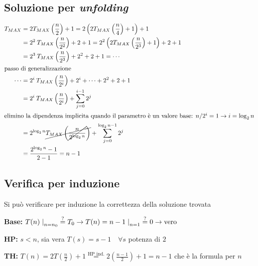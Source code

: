 \subsection{Soluzione per \textit{unfolding}}
\begin{equation*}
    \begin{split}
        T_{MAX} &=
        2 T_{MAX} \left( \frac{n}{2} \right) + 1
        = 2 \left( 2 T_{MAX} \left( \frac{n}{4} \right) + 1 \right) + 1 \\
        &= 2^2 \:T_{MAX} \left( \frac{n}{2^2} \right) +2 +1
        = 2^2 \left( 2 T_{MAX} \left( \frac{n}{2^3} \right) + 1 \right) +2+1 \\
        &= 2^3 \:T_{MAX} \left( \frac{n}{2^3} \right) +2^2 +2 +1 = \cdots \\ 
        \intertext{passo di generalizzazione}
        \cdots &=2^i \:T_{MAX} \left( \frac{n}{2^i} \right) +2^i + \cdots +2^2 +2 +1 \\
        &= 2^i \:T_{MAX} \left( \frac{n}{2^i} \right) + \sum_{j=0}^{i-1} 2^j \\
        \intertext{elimino la dipendenza implicita quando il parametro è un valore base: $n / 2^i=1 \rightarrow i=\log_2 n$}
        &= 2^{\log_2 n} \cancel{ T_{MAX} \left( \cancel{\frac{n}{2^{\log_2 n}} } \right) } 
        + \sum_{j=0}^{\log_2 n-1} 2^j \\
        &= \frac{2^{\log_2 n}-1}{2-1} = n-1
    \end{split}
\end{equation*}

\subsection{Verifica per induzione}
Si può verificare per induzione la correttezza della soluzione trovata 

\begin{description}
    \item{\textbf{Base:}} $T(n)\left. \right|_{n=n_0} \overset{?}{=} T_0 \rightarrow 
            T(n)=n-1 \left. \right|_{n=1} \overset{?}{=} 0 \rightarrow \text{vero}$
    \item{\textbf{HP:}} $s < n$, sia vera $T(s) = s-1 \quad \forall s $ potenza di $2$
    \item{\textbf{TH:}} $T(n) = 2T \left( \frac{n}{2} \right) +1 \overset{\text{HP ind.}}{=} 
            2 \left( \frac{n-1}{2} \right)+1 = n-1$ che è la formula per $n$
\end{description}

